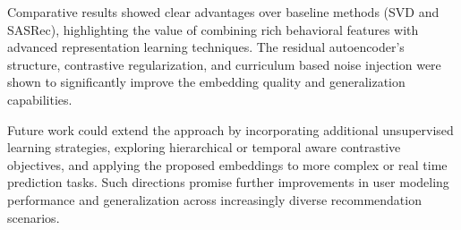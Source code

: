 \documentclass[sigconf]{acmart}
\begin{document}
Comparative results showed clear advantages over baseline methods (SVD and SASRec), highlighting the value of combining rich behavioral features with advanced representation learning techniques. The residual autoencoder’s structure, contrastive regularization, and curriculum based noise injection were shown to significantly improve the embedding quality and generalization capabilities.

Future work could extend the approach by incorporating additional unsupervised learning strategies, exploring hierarchical or temporal aware contrastive objectives, and applying the proposed embeddings to more complex or real time prediction tasks. Such directions promise further improvements in user modeling performance and generalization across increasingly diverse recommendation scenarios.



\end{document}
